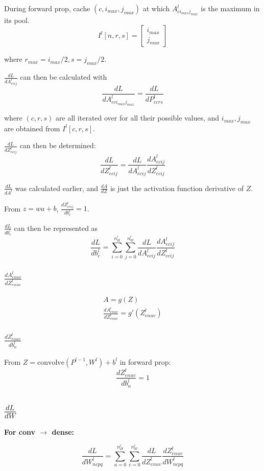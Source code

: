 \documentclass[12pt]{article}
\begin{document}
During forward prop, cache $(c, i_{max}, j_{max})$ at which $A^l_{ci_{max}j_{max}}$ is the maximum
in its pool.
\[ I^l[n,r,s] = \begin{bmatrix}i_{max}\\j_{max}\end{bmatrix} \]

where $r_{max} = i_{max}/2, s = j_{max}/2$.

$\frac{dL}{dA^{l}_{ecij}}$ can then be calculated with
\[ \frac{dL}{dA^l_{eci_{max}j_{max}}} = \frac{dL}{dP^l_{ecrs}} \]

where $(c,r,s)$ are all iterated over for all their possible values, and $i_{max}, j_{max}$
are obtained from $I^l[c,r,s]$.

$\frac{dL}{dZ^l_{ecij}}$ can then be determined:
\[ \frac{dL}{dZ^l_{ecij}} = \frac{dL}{dA^l_{ecij}} \frac{dA^l_{ecij}}{dZ^l_{ecij}} \]

$\frac{dL}{dA^l}$ was calculated earlier, and $\frac{dA}{dZ}$ is just the activation function derivative of $Z$.

From $z = wa + b$, $\frac{dZ^l_{ecij}}{db^l_c} = 1$.

$\frac{dL}{db^l_c}$ can then be represented as
\[ \frac{dL}{db^l_c} = \sum_{i=0}^{n_H^l} \sum_{j=0}^{n_W^l} \frac{dL}{dA^l_{ecij}} \frac{dA^l_{ecij}}{dZ^l_{ecij}} \]

\subsubsection{$\frac{dA^l_{enuv}}{dZ^l_{enuv}}$}

\begin{gather*}
    A = g(Z)\\
    \frac{dA^l_{enuv}}{dZ^l_{enuv}} = g'(Z^l_{enuv})
\end{gather*}

\subsubsection{$\frac{dZ^l_{enuv}}{db^l_n}$}

From $Z = \text{convolve}(P^{l-1},W^l) + b^l$ in forward prop:
\[ \frac{dZ^l_{enuv}}{db^l_n} = 1 \]

\subsection{$\frac{dL}{dW}$}

\textbf{For conv $\rightarrow$ dense:}

\[ \frac{dL}{dW^l_{ncpq}} = \sum_{u=0}^{n_H^l} \sum_{v=0}^{n_W^l} \frac{dL}{dZ^l_{enuv}}
\frac{dZ^l_{enuv}}{dW^l_{ncpq}} \]
\end{document}
